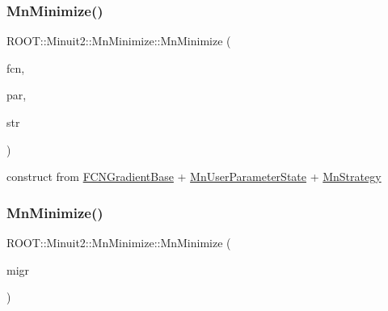 \subsubsection{\texorpdfstring{MnMinimize()}{MnMinimize()}\hspace{0.1cm}{\footnotesize\ttfamily [12/26]}}
{\footnotesize\ttfamily R\+O\+O\+T\+::\+Minuit2\+::\+Mn\+Minimize\+::\+Mn\+Minimize (\begin{DoxyParamCaption}\item[{const \mbox{\hyperlink{classROOT_1_1Minuit2_1_1FCNGradientBase}{F\+C\+N\+Gradient\+Base}} \&}]{fcn,  }\item[{const \mbox{\hyperlink{classROOT_1_1Minuit2_1_1MnUserParameterState}{Mn\+User\+Parameter\+State}} \&}]{par,  }\item[{const \mbox{\hyperlink{classROOT_1_1Minuit2_1_1MnStrategy}{Mn\+Strategy}} \&}]{str }\end{DoxyParamCaption})\hspace{0.3cm}{\ttfamily [inline]}}



construct from \mbox{\hyperlink{classROOT_1_1Minuit2_1_1FCNGradientBase}{F\+C\+N\+Gradient\+Base}} + \mbox{\hyperlink{classROOT_1_1Minuit2_1_1MnUserParameterState}{Mn\+User\+Parameter\+State}} + \mbox{\hyperlink{classROOT_1_1Minuit2_1_1MnStrategy}{Mn\+Strategy}} 

\mbox{\label{classROOT_1_1Minuit2_1_1MnMinimize_a5381e16cfd79c2b4da61e399a6a02b35}} 
\subsubsection{\texorpdfstring{MnMinimize()}{MnMinimize()}\hspace{0.1cm}{\footnotesize\ttfamily [13/26]}}
{\footnotesize\ttfamily R\+O\+O\+T\+::\+Minuit2\+::\+Mn\+Minimize\+::\+Mn\+Minimize (\begin{DoxyParamCaption}\item[{const \mbox{\hyperlink{classROOT_1_1Minuit2_1_1MnMinimize}{Mn\+Minimize}} \&}]{migr }\end{DoxyParamCaption})\hspace{0.3cm}{\ttfamily [inline]}}

\mbox{\label{classROOT_1_1Minuit2_1_1MnMinimize_ae4544af29d79b1415179ce48c05b9ae0}} 
